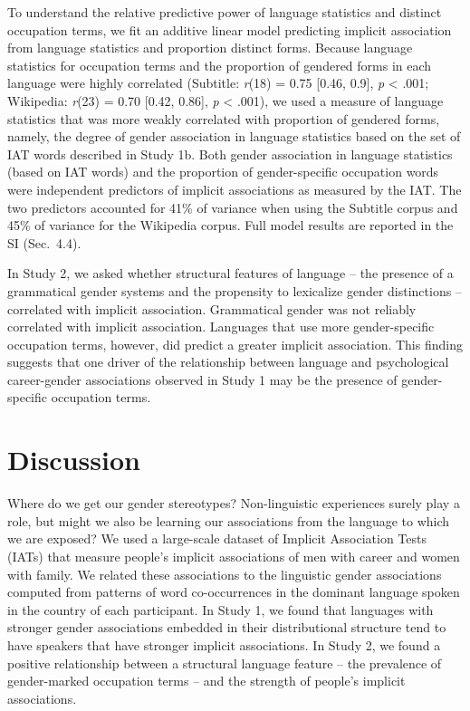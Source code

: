\documentclass[9pt,twocolumn]{pnas-new}
\begin{document}
To understand the relative predictive power of language statistics and
distinct occupation terms, we fit an additive linear model predicting implicit association
from language statistics and proportion distinct forms. Because language statistics for occupation terms and
the proportion of gendered forms in each language were highly correlated (Subtitle: \emph{r}(18)  = 0.75 {[}0.46, 0.9{]}, \emph{p}
\textless{} .001; Wikipedia: \emph{r}(23) =
0.70  {[}0.42, 0.86{]}, \emph{p} \textless{} .001), we used a measure of language statistics that was more weakly correlated with proportion of gendered forms, namely, the degree of gender association in language statistics
based on the set of IAT words described in Study 1b. Both
gender association in language statistics (based on IAT words) and the
proportion of gender-specific occupation words were independent
predictors of implicit associations as measured by the IAT. The two predictors accounted for 41\% of
variance when using the Subtitle corpus and 45\% of
variance for the Wikipedia corpus. Full model results are reported in
the SI (Sec.\ 4.4).

In Study 2, we asked whether structural features of language -- the
presence of a grammatical gender systems and the propensity to
lexicalize gender distinctions -- correlated with implicit association.
Grammatical gender was not reliably correlated with implicit association.
Languages that use more gender-specific occupation terms, however, did
predict a greater implicit association. This finding suggests that one driver of the relationship between language and psychological career-gender associations observed in Study 1 may be the presence of gender-specific occupation terms. 

\section*{Discussion}\label{general-discussion}

Where do we get our gender stereotypes? Non-linguistic experiences surely play a role, but might we also be learning our associations from the language to which we are exposed? We used a large-scale dataset of Implicit Association Tests (IATs) that measure people's implicit associations of men with career and women with family. We related these associations to the linguistic gender associations computed from patterns of word co-occurrences in the dominant language spoken in the country of each participant. In Study 1, we found that languages with stronger gender associations embedded in their distributional structure tend to have speakers that have stronger implicit associations. In Study 2, we found a positive relationship between a structural language feature – the prevalence of gender-marked occupation terms – and the strength of people's implicit associations. 
\end{document}
